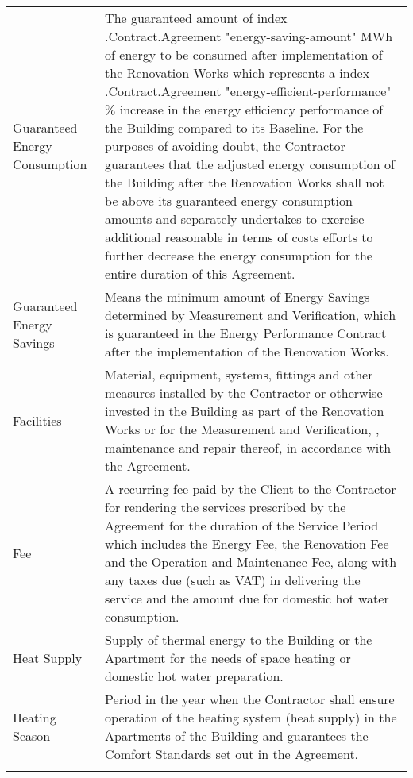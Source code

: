 \documentclass[a4paper]{article}
\begin{document}
\begin{longtabu}{|X|X[2]|}
   \hline

   Guaranteed Energy Consumption&The guaranteed amount of  {{index .Contract.Agreement "energy-saving-amount"}} MWh
   of energy to be consumed after implementation of the Renovation
   Works which represents a {{index .Contract.Agreement "energy-efficient-performance"}} \% increase in the energy
   efficiency performance of the Building compared to its Baseline. For
   the purposes of avoiding doubt, the Contractor guarantees that the
   adjusted energy consumption of the Building after the Renovation
   Works shall not be above its guaranteed energy consumption amounts
   and separately undertakes to exercise additional reasonable in terms
   of costs efforts to further decrease the energy consumption for the
   entire duration of this Agreement.\\\tabucline{}

   \hline

   Guaranteed Energy Savings &Means the minimum amount of Energy
   Savings determined by Measurement and Verification, which is
   guaranteed in the Energy Performance Contract after the
   implementation of the Renovation Works.\\\tabucline{}

   \hline

   Facilities&Material, equipment, systems, fittings and other measures
   installed by the Contractor or otherwise invested in the Building as
   part of the Renovation Works or for the Measurement and
   Verification, , maintenance and repair thereof, in accordance with
   the Agreement.\\\tabucline{}

   \hline

   Fee & A recurring fee paid by the Client to the Contractor for
   rendering the services prescribed by the Agreement for the duration
   of the Service Period which includes the Energy Fee, the Renovation
   Fee and the Operation and Maintenance Fee, along with any taxes due
   (such as VAT) in delivering the service and the amount due for
   domestic hot water consumption.\\\tabucline{}

   \hline

   Heat Supply & Supply of thermal energy to the Building or the
   Apartment for the needs of space heating or domestic hot water
   preparation.\\\tabucline{}

   \hline

   Heating Season & Period in the year when the Contractor shall ensure
   operation of the heating system (heat supply) in the Apartments of
   the Building and guarantees the Comfort Standards set out in the
   Agreement.\\\tabucline{}


\end{longtabu}
\end{document}
